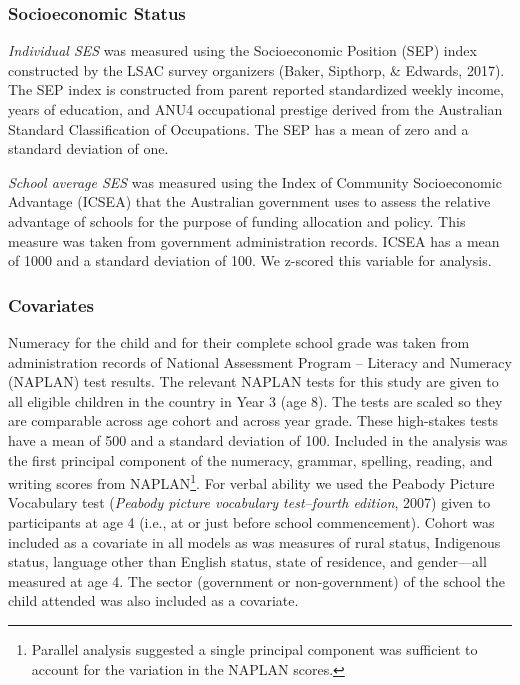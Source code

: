 \documentclass[
  english,
  man]{apa6}
\begin{document}
\hypertarget{socioeconomic-status}{%
\subsubsection{Socioeconomic Status}\label{socioeconomic-status}}

\emph{Individual SES} was measured using the Socioeconomic Position (SEP) index constructed by the LSAC survey organizers (Baker, Sipthorp, \& Edwards, 2017). The SEP index is constructed from parent reported standardized weekly income, years of education, and ANU4 occupational prestige derived from the Australian Standard Classification of Occupations. The SEP has a mean of zero and a standard deviation of one.

\emph{School average SES} was measured using the Index of Community Socioeconomic Advantage (ICSEA) that the Australian government uses to assess the relative advantage of schools for the purpose of funding allocation and policy. This measure was taken from government administration records. ICSEA has a mean of 1000 and a standard deviation of 100. We z-scored this variable for analysis.

\hypertarget{covariates}{%
\subsubsection{Covariates}\label{covariates}}

Numeracy for the child and for their complete school grade was taken from administration records of National Assessment Program -- Literacy and Numeracy (NAPLAN) test results. The relevant NAPLAN tests for this study are given to all eligible children in the country in Year 3 (age 8). The tests are scaled so they are comparable across age cohort and across year grade. These high-stakes tests have a mean of 500 and a standard deviation of 100. Included in the analysis was the first principal component of the numeracy, grammar, spelling, reading, and writing scores from NAPLAN\footnote{Parallel analysis suggested a single principal component was sufficient to account for the variation in the NAPLAN scores.}. For verbal ability we used the Peabody Picture Vocabulary test (\emph{Peabody picture vocabulary test--fourth edition}, 2007) given to participants at age 4 (i.e., at or just before school commencement). Cohort was included as a covariate in all models as was measures of rural status, Indigenous status, language other than English status, state of residence, and gender---all measured at age 4. The sector (government or non-government) of the school the child attended was also included as a covariate.
\end{document}
